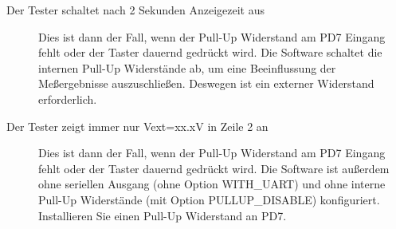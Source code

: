\begin{description}
\item[Der Tester schaltet nach 2 Sekunden Anzeigezeit aus]  
Dies ist dann der Fall, wenn der Pull-Up Widerstand am PD7 Eingang
fehlt oder der Taster dauernd gedrückt wird. 
Die Software schaltet die internen Pull-Up Widerstände ab, um eine Beeinflussung
der Meßergebnisse auszuschließen. Deswegen ist ein externer Widerstand erforderlich.

\item[Der Tester zeigt immer nur Vext=xx.xV in Zeile 2 an]
Dies ist dann der Fall, wenn der Pull-Up Widerstand am PD7 Eingang
fehlt oder der Taster dauernd gedrückt wird.
Die Software ist außerdem ohne seriellen Ausgang (ohne Option WITH\_UART) und
ohne interne Pull-Up Widerstände (mit Option PULLUP\_DISABLE) konfiguriert.
Installieren Sie einen Pull-Up Widerstand an PD7.

\end{description}
